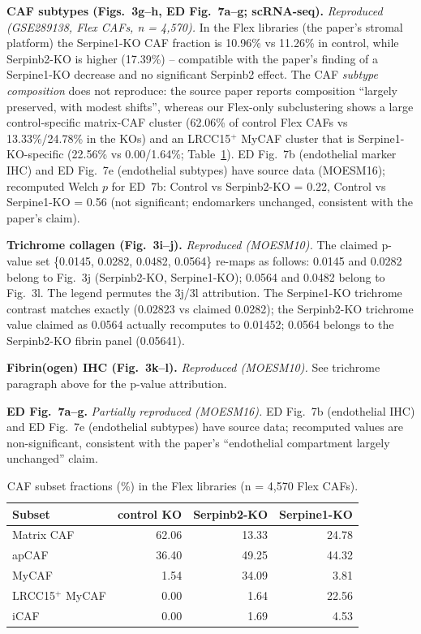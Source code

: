 \documentclass[preprint,12pt]{elsarticle}
\begin{document}
\textbf{CAF subtypes (Figs.~3g--h, ED Fig.~7a--g; scRNA-seq).}
\emph{Reproduced (GSE289138, Flex CAFs, n = 4{,}570).} In the Flex
libraries (the paper's stromal platform) the Serpine1-KO CAF
fraction is 10.96\% vs 11.26\% in control, while Serpinb2-KO is
higher (17.39\%) -- compatible with the paper's finding of a
Serpine1-KO decrease and no significant Serpinb2 effect. The CAF
\emph{subtype composition} does not reproduce: the source paper
reports composition ``largely preserved, with modest shifts'',
whereas our Flex-only subclustering shows a large control-specific
matrix-CAF cluster (62.06\% of control Flex CAFs vs
13.33\%/24.78\% in the KOs) and an LRCC15$^{+}$ MyCAF cluster
that is Serpine1-KO-specific (22.56\% vs 0.00/1.64\%;
Table~\ref{tab:caf}). ED Fig.~7b (endothelial marker IHC) and
ED Fig.~7e (endothelial subtypes) have source data (MOESM16);
recomputed Welch $p$ for ED~7b: Control vs Serpinb2-KO = 0.22,
Control vs Serpine1-KO = 0.56 (not significant; endomarkers
unchanged, consistent with the paper's claim).

\textbf{Trichrome collagen (Fig.~3i--j).} \emph{Reproduced
(MOESM10).} The claimed p-value set \{0.0145, 0.0282, 0.0482,
0.0564\} re-maps as follows: 0.0145 and 0.0282 belong to Fig.~3j
(Serpinb2-KO, Serpine1-KO); 0.0564 and 0.0482 belong to Fig.~3l.
The legend permutes the 3j/3l attribution. The Serpine1-KO
trichrome contrast matches exactly (0.02823 vs claimed 0.0282);
the Serpinb2-KO trichrome value claimed as 0.0564 actually
recomputes to 0.01452; 0.0564 belongs to the Serpinb2-KO fibrin
panel (0.05641).

\textbf{Fibrin(ogen) IHC (Fig.~3k--l).} \emph{Reproduced
(MOESM10).} See trichrome paragraph above for the p-value
attribution.

\textbf{ED Fig.~7a--g.} \emph{Partially reproduced (MOESM16).}
ED Fig.~7b (endothelial IHC) and ED Fig.~7e (endothelial
subtypes) have source data; recomputed values are non-significant,
consistent with the paper's ``endothelial compartment largely
unchanged'' claim.

\begin{table}[t]
\centering
\footnotesize
\caption{CAF subset fractions (\%) in the Flex libraries
(n = 4{,}570 Flex CAFs).}
\label{tab:caf}
\begin{tabular}{lrrr}
\toprule
Subset & control KO & Serpinb2-KO & Serpine1-KO \\
\midrule
Matrix CAF       & 62.06 & 13.33 & 24.78 \\
apCAF            & 36.40 & 49.25 & 44.32 \\
MyCAF            & 1.54 & 34.09 & 3.81 \\
LRCC15$^{+}$ MyCAF & 0.00 & 1.64 & 22.56 \\
iCAF             & 0.00 & 1.69 & 4.53 \\
\bottomrule
\end{tabular}
\end{table}
\end{document}
